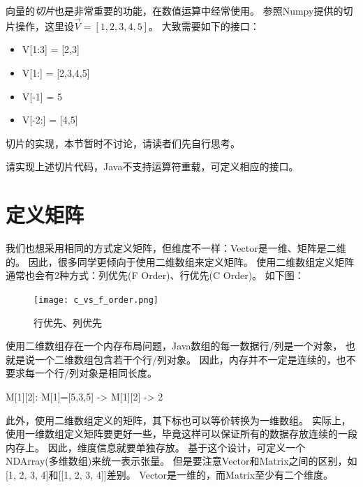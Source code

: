 {}
\vspace{1em}

\noindent
向量的\emph{切片}也是非常重要的功能，在数值运算中经常使用。
参照Numpy提供的切片操作，这里设$\vec{V}=[1,2,3,4,5]$。
大致需要如下的接口：

\begin{itemize}
\item V[1:3] = [2,3]
\item V[1:]  = [2,3,4,5]
\item V[-1]  = 5
\item V[-2:] = [4,5]
\end{itemize}

\noindent
切片的实现，本节暂时不讨论，请读者们先自行思考。

\bigskip
\begin{exercise}
	请实现上述切片代码，Java不支持运算符重载，可定义相应的接口。
\end{exercise}


\section{定义矩阵}
我们也想采用相同的方式定义矩阵，但维度不一样：Vector是一维、矩阵是二维的。
因此，很多同学更倾向于使用二维数组来定义矩阵。
使用二维数组定义矩阵通常也会有2种方式：列优先(F Order)、行优先(C Order)。
如下图：

\begin{figure}[!htb]
    \caption{行优先、列优先}
    \centerline{\texttt{[image: c\_vs\_f\_order.png]}}
\end{figure}

\noindent
使用二维数组存在一个内存布局问题，Java数组的每一数据行/列是一个对象，
也就是说一个二维数组包含若干个行/列对象。
因此，内存并不一定是连续的，也不要求每一个行/列对象是相同长度。

\medskip
\centerline{
    M[1][2]: M[1]=[5,3,5] -> M[1][2] -> 2
}
\medskip

\noindent
此外，使用二维数组定义的矩阵，其下标也可以等价转换为一维数组。
实际上，使用一维数组定义矩阵要更好一些，毕竟这样可以保证所有的数据存放连续的一段内存上。
因此，维度信息就要单独存放。
基于这个设计，可定义一个NDArray(多维数组)来统一表示张量。
但是要注意Vector和Matrix之间的区别，如[1, 2, 3, 4]和[[1, 2, 3, 4]]差别。
Vector是一维的，而Matrix至少有二个维度。

\begin{figure}[!htb]
\begin{center}
\end{center}
\end{figure}

